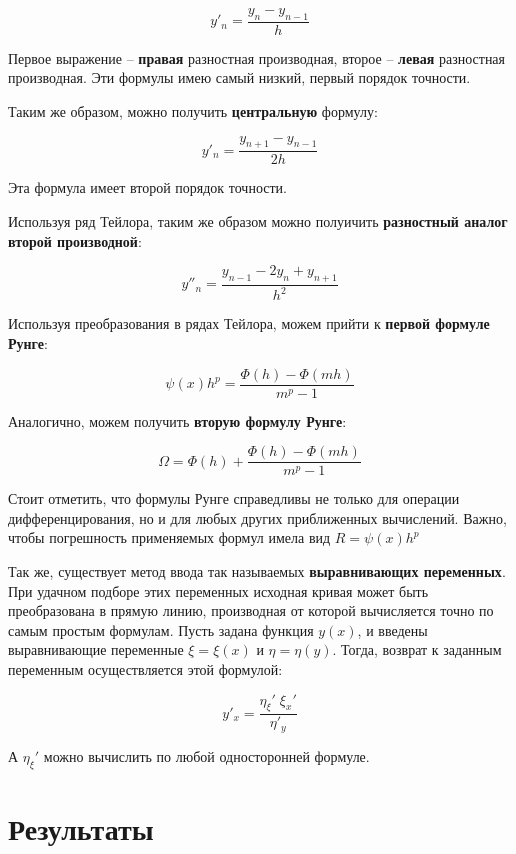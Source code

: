 \documentclass[a4paper,12pt]{article}
\begin{document}
$$ y'_{n} = \frac{y_{n} - y_{n - 1}}{h} $$

\noindent Первое выражение -- \textbf{правая} разностная производная, второе -- \textbf{левая} разностная производная.
\noindent Эти формулы имею самый низкий, первый порядок точности.\newline

\noindent Таким же образом, можно получить \textbf{центральную} формулу:

$$ y'_{n} = \frac{y_{n + 1} - y_{n - 1}}{2h} $$

\noindent Эта формула имеет второй порядок точности.\newline

\noindent Используя ряд Тейлора, таким же образом можно полуичить \textbf{разностный аналог второй производной}:

$$ y''_{n} = \frac{y_{n - 1} - 2 y_{n} + y_{n + 1}}{h^2} $$


\noindent Используя преобразования в рядах Тейлора, можем прийти к \textbf{первой формуле Рунге}: \newline

$$ \psi(x)h^p = \frac{\Phi(h) - \Phi(mh)}{m^p - 1} $$

\noindent Аналогично, можем получить \textbf{вторую формулу Рунге}:\newline

$$ \Omega = \Phi(h) + \frac{\Phi(h) - \Phi(mh)}{m^p - 1} $$\newline

\noindent Стоит отметить, что формулы Рунге справедливы не только для операции дифференцирования, но и для любых других приближенных вычислений. Важно, чтобы погрешность применяемых формул имела вид $R = \psi(x)h^p$\newline

\noindent Так же, существует метод ввода так называемых \textbf{выравнивающих переменных}. При удачном подборе этих переменных исходная кривая может быть преобразована в прямую линию, производная от которой вычисляется точно по самым простым формулам. Пусть задана функция $y(x)$, и введены выравнивающие переменные $\xi = \xi(x)$ и $\eta = \eta(y)$. Тогда, возврат к заданным переменным осуществляется этой формулой:

$$ y'_{x} = \frac{\eta_{\xi}'\;\xi_{x}'}{\eta'_{y}} $$

\noindent А $\eta_{\xi}'$ можно вычислить по любой односторонней формуле.

\clearpage %

\section{Результаты}
\end{document}
